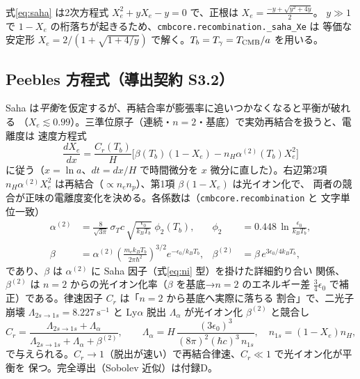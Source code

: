 \begin{numreality}
式\eqref{eq:saha} は2次方程式 $X_e^2+yX_e-y=0$ で、正根は $X_e=\tfrac{-y+\sqrt{y^2+4y}}{2}$。
$y\gg1$ で $1-X_e$ の桁落ちが起きるため、\texttt{cmbcore.recombination.\_saha\_Xe} は
等価な安定形 $X_e=2/(1+\sqrt{1+4/y})$ で解く。$T_b=T_\gamma=T_{\rm CMB}/a$ を用いる。
\end{numreality}

\subsection{Peebles 方程式（導出契約 S3.2）}
Saha は\emph{平衡}を仮定するが、再結合率が膨張率に追いつかなくなると平衡が破れる
（$X_e\lesssim0.99$）。三準位原子（連続・$n=2$・基底）で実効再結合を扱うと、電離度は
速度方程式
\begin{equation}
  \frac{dX_e}{dx}=\frac{C_r(T_b)}{H}\Big[\beta(T_b)(1-X_e)-n_H\alpha^{(2)}(T_b)X_e^2\Big]
  \label{eq:peebles}
\end{equation}
に従う（$x=\ln a$、$dt=dx/H$ で時間微分を $x$ 微分に直した）。右辺第2項
$n_H\alpha^{(2)}X_e^2$ は再結合（$\propto n_en_p$）、第1項 $\beta(1-X_e)$ は光イオン化で、
両者の競合が正味の電離度変化を決める。各係数は（\texttt{cmbcore.recombination} と
文字単位一致）
\begin{align}
  \alpha^{(2)}&=\frac{8}{\sqrt{3\pi}}\,\sigma_Tc\,
    \sqrt{\frac{\epsilon_0}{k_BT_b}}\;\phi_2(T_b), &
  \phi_2&=0.448\,\ln\!\frac{\epsilon_0}{k_BT_b}, \label{eq:alpha2}\\
  \beta&=\alpha^{(2)}\left(\frac{m_ek_BT_b}{2\pi\hbar^2}\right)^{3/2}
    e^{-\epsilon_0/k_BT_b}, &
  \beta^{(2)}&=\beta\,e^{3\epsilon_0/4k_BT_b}, \label{eq:beta}
\end{align}
であり、$\beta$ は $\alpha^{(2)}$ に Saha 因子（式\eqref{eq:ni} 型）を掛けた詳細釣り合い
関係、$\beta^{(2)}$ は $n=2$ からの光イオン化率（$\beta$ を基底→$n=2$ のエネルギー差
$\tfrac34\epsilon_0$ で補正）である。律速因子 $C_r$ は「$n=2$ から基底へ実際に落ちる
割合」で、二光子崩壊 $\Lambda_{2s\to1s}=8.227~\mathrm{s^{-1}}$ と Ly$\alpha$ 脱出
$\Lambda_\alpha$ が光イオン化 $\beta^{(2)}$ と競合し
\begin{equation}
  C_r=\frac{\Lambda_{2s\to1s}+\Lambda_\alpha}{\Lambda_{2s\to1s}+\Lambda_\alpha+\beta^{(2)}},
  \qquad
  \Lambda_\alpha=H\,\frac{(3\epsilon_0)^3}{(8\pi)^2(\hbar c)^3\,n_{1s}},
  \quad n_{1s}=(1-X_e)n_H,
  \label{eq:Cr}
\end{equation}
で与えられる。$C_r\to1$（脱出が速い）で再結合律速、$C_r\ll1$ で光イオン化が平衡を
保つ。完全導出（Sobolev 近似）は付録D。

